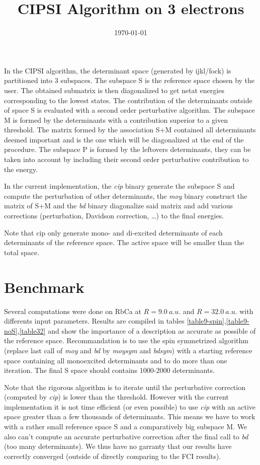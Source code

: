 \documentclass[a4paper,10pt]{article}
\title{CIPSI Algorithm on 3 electrons}
\author{}
\date{\today}
\begin{document}
\maketitle

In the CIPSI algorithm, the determinant space (generated by ijkl/fock) is partitioned into 3 subspaces.
The subspace S is the reference space chosen by the user. The obtained submatrix is then diagonalized to get netat energies corresponding to the lowest states. The contribution of the determinants outside of space S is evaluated with a second order perturbative algorithm.
The subspace M is formed by the determinants with a contribution superior to a given threshold. The matrix formed by the association S+M contained all determinants deemed important and is the one which will be diagonalized at the end of the procedure.
The subspace P is formed by the leftovers determinants, they can be taken into account by including their second order perturbative contribution to the energy.


In the current implementation, the \textit{cip} binary generate the subspace S and compute the perturbation of other determinants, the \textit{moy} binary construct the matrix of S+M and the \textit{bd} binary diagonalize said matrix and add various corrections (perturbation, Davidson correction, …) to the final energies.


Note that cip only generate mono- and di-excited determinants of each determinants of the reference space. The active space will be smaller than the total space. 

\section{Benchmark}

Several computations were done on RbCa at $R=9.0~a.u.$ and $R=32.0~a.u.$ with differents input parameters. Results are compiled in tables \ref{table9-spin},\ref{table9-noS},\ref{table32} and show the importance of a description as accurate as possible of the reference space. Recommandation is to use the spin symmetrized algorithm (replace last call of \textit{moy} and \textit{bd} by \textit{moysym} and \textit{bdsym}) with a starting reference space containing all monoexcited determinants and to do more than one iteration. The final S space should contains 1000-2000 determinants.

Note that the rigorous algorithm is to iterate until the perturbative correction (computed by \textit{cip}) is lower than the threshold. However with the current implementation it is not time efficient (or even possible) to use \textit{cip} with an active space greater than a few thousands of determinants. This means we have to work with a rather small reference space S and a comparatively big subspace M. We also can't compute an accurate perturbative correction after the final call to \textit{bd} (too many determinants). We thus have no garranty that our results have correctly converged (outside of directly comparing to the FCI results). 
\end{document}

